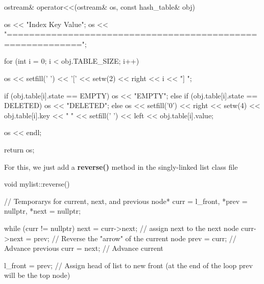 \documentclass{report}
\begin{document}
    \pagebreak 
    \begin{cppcode}
        ostream& operator<<(ostream& os, const hash_table& obj)
        {
            os << "Index  Key    Value\n";
            os << "===========================================================\n";

            for (int i = 0; i < obj.TABLE_SIZE; i++)
            {
                os << setfill(' ') << '[' << setw(2) << right << i << "]   ";

                if (obj.table[i].state == EMPTY)
                os << "EMPTY";
                else if (obj.table[i].state == DELETED)
                os << "DELETED";
                else
                os << setfill('0') << right << setw(4) << obj.table[i].key
                << "   " << setfill(' ') << left << obj.table[i].value;

                os << endl;
            }

            return os;
        }

    \end{cppcode}

    \pagebreak 
    \bigbreak \noindent 
    For this, we just add a \textbf{reverse()} method in the singly-linked list class file 
    \bigbreak \noindent 
    \begin{cppcode}
        void mylist::reverse()
        {
            // Temporarys for current, next, and previous
            node* curr = l_front, *prev = nullptr, *next = nullptr;

            while (curr != nullptr) {
                next = curr->next; // assign next to the next node
                curr->next = prev; // Reverse the "arrow" of the current node
                prev = curr; // Advance previous
                curr = next; // Advance current
            }

            l_front = prev; // Assign head of list to new front (at the end of the loop prev will be the top node)
        }
    \end{cppcode}

    \pagebreak 
    \bigbreak \noindent 
   
    

    







    
    
\end{document}
